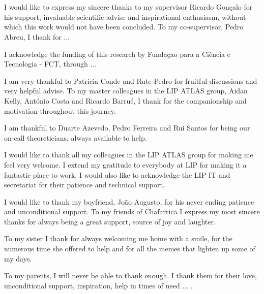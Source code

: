 
\section*{\acknowledgments}



I would like to express my sincere thanks to my supervisor Ricardo Gon\c calo for his support, invaluable scientific advise and inspirational enthusiasm, without which this work would not have been concluded. To my co-supervisor, Pedro Abreu, I thank for ...

I acknowledge the funding of this research by Funda\c cao para a Ci\^encia e Tecnologia - FCT, through ...

I am very thankful to Patricia Conde and Rute Pedro for fruitful discussions and very helpful advise. To my master colleagues in the LIP ATLAS group, Aidan Kelly, Ant\'onio Costa and Ricardo Barru\'e, I thank for the companionship and motivation throughout this journey. 

I am thankful to Duarte Azevedo, Pedro Ferreira and Rui Santos for being our on-call theoreticians, always available to help.   

I would like to thank all my colleagues in the LIP ATLAS group for making me feel very welcome. I extend my gratitude to everybody at LIP for making it a fantastic place to work. I would also like to acknowledge the LIP IT and secretariat for their patience and technical support.

I would like to thank my boyfriend, Jo\~ao Augusto, for his never ending patience and unconditional support. To my friends of Chafarrica I express my most sincere thanks for always being a great support, source of joy and laughter. 

To my sister I thank for always welcoming me home with a smile, for the numerous time she offered to help and for all the memes that lighten up some of my days.

To my parents, I will never be able to thank enough. I thank them for their love, unconditional support, inspiration, help in times of need ... . 
